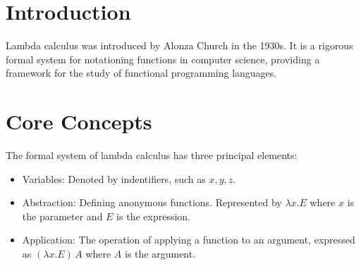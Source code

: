 \section{Introduction}
Lambda calculus was introduced by Alonza Church in the 1930s. It is a rigorous formal system for notationing functions in computer science, providing a framework for the study of functional programming languages.
\section{Core Concepts}
The formal system of lambda calculus has three principal elements:
\begin{itemize}
    \item Variables: Denoted by indentifiers, such as $x, y, z$.
    \item Abstraction: Defining anonymous functions. Represented by $\lambda x.E$ where $x$ is the parameter and $E$ is the expression.
    \item Application: The operation of applying a function to an argument, expressed as $(\lambda x.E)\, A$ where $A$ is the argument.
\end{itemize}